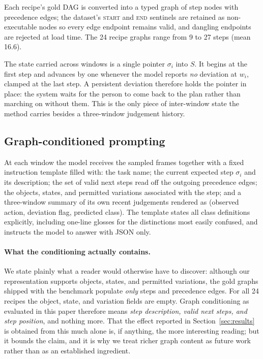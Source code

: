 \documentclass[10pt,twocolumn]{article}
\begin{document}
Each recipe's gold DAG is converted into a typed graph of step nodes with
precedence edges; the dataset's \textsc{start} and \textsc{end} sentinels are
retained as non-executable nodes so every edge endpoint remains valid, and
dangling endpoints are rejected at load time. The 24 recipe graphs range from 9
to 27 steps (mean 16.6).

The state carried across windows is a single pointer $\sigma_i$ into $S$. It
begins at the first step and advances by one whenever the model reports
\emph{no} deviation at $w_i$, clamped at the last step. A persistent deviation
therefore holds the pointer in place: the system waits for the person to come
back to the plan rather than marching on without them. This is the only piece of
inter-window state the method carries besides a three-window judgement history.

\subsection{Graph-conditioned prompting}

At each window the model receives the sampled frames together with a fixed
instruction template filled with: the task name; the current expected step
$\sigma_i$ and its description; the set of valid next steps read off the outgoing
precedence edges; the objects, states, and permitted variations associated with
the step; and a three-window summary of its own recent judgements rendered as
(observed action, deviation flag, predicted class). The template states all
class definitions explicitly, including one-line glosses for the distinctions
most easily confused, and instructs the model to answer with JSON only.

\paragraph{What the conditioning actually contains.} We state plainly what a
reader would otherwise have to discover: although our representation supports
objects, states, and permitted variations, the gold graphs shipped with the
benchmark populate \emph{only} steps and precedence edges. For all 24 recipes the
object, state, and variation fields are empty. Graph conditioning as evaluated in
this paper therefore means \emph{step description, valid next steps, and step
position}, and nothing more. That the effect reported in
Section~\ref{sec:results} is obtained from this much alone is, if anything, the
more interesting reading; but it bounds the claim, and it is why we treat richer
graph content as future work rather than as an established ingredient.
\end{document}
